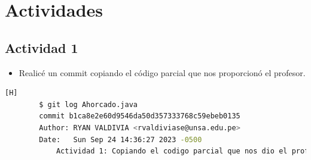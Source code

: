 \documentclass{article}
\begin{document}
	\section{Actividades}
	\subsection{Actividad 1}
	
	\begin{itemize}	
		\item Realicé un commit copiando el código parcial que nos proporcionó el profesor.
	\end{itemize}	
	\begin{lstlisting}[language=bash,caption={Comentando el código paricial}][H]
		$ git log Ahorcado.java
		commit b1ca8e2e60d9546da50d357333768c59ebeb0135
		Author: RYAN VALDIVIA <rvaldiviase@unsa.edu.pe>
		Date:   Sun Sep 24 14:36:27 2023 -0500
			Actividad 1: Copiando el codigo parcial que nos dio el profesor
	\end{lstlisting}
\end{document}

